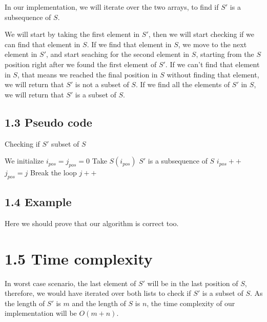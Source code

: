 \documentclass{article}
\begin{document}
In our implementation, we will iterate over the two arrays, to find if $S'$ is a subsequence of $S$.

We will start by taking the first element in $S'$, then we will start checking if we can find that element in $S$. If we find that element in $S$, we move to the next element in $S'$, and start seaching for the second element in $S$, starting from the $S$ position right after we found the first element of $S'$. If we can't find that element in $S$, that means we reached the final position in $S$ without finding that element, we will return that $S'$ is not a subset of $S$. If we find all the elements of $S'$ in $S$, we will return that $S'$ is a subset of $S$.

\subsection*{1.3 Pseudo code}

\begin{algorithm}[H]
\caption{Checking if $S'$ subset of $S$}
\begin{algorithmic}[1]
\State We initialize $i_{pos} = j_{pos} = 0$
 \State Take $S(i_{pos})$
    \State $S'$ is a subsequence of $S$
   \EndIf
    \State $i_{pos}++$
    \State $j_{pos} = j$
    \State Break the loop
   \EndIf
  \EndIf
   \State $j++$
  \EndIf
 \EndFor
\EndWhile
\end{algorithmic}
\end{algorithm}

\subsection*{1.4 Example}

Here we should prove that our algorithm is correct too.



\section*{1.5 Time complexity}

In worst case scenario, the last element of $S'$ will be in the last position of $S$, therefore, we would have iterated over both lists to check if $S'$ is a subset of $S$. As the length of $S'$ is $m$ and the length of $S$ is $n$, the time complexity of our implementation will be $O(m+n)$.
\end{document}
